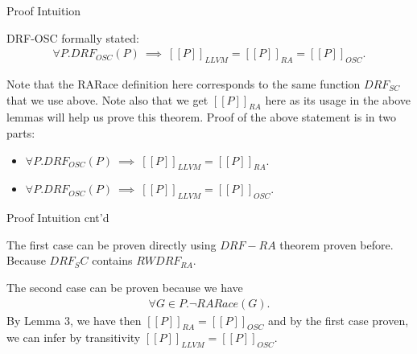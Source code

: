 \documentclass[xcolor=dvipsnames, notes]{beamer}
\begin{document}
    \begin{frame}{Proof Intuition}

        DRF-OSC formally stated:
        \begin{align*}
            \forall P.DRF_{OSC}(P) \ \implies \ [[P]]_{LLVM} = [[P]]_{RA} = [[P]]_{OSC}. 
        \end{align*}

        Note that the RARace definition here corresponds to the same function $DRF_{SC}$ that we use above.
        Note also that we get $[[P]]_{RA}$ here as its usage in the above lemmas will help us prove this theorem.
        Proof of the above statement is in two parts:
        \begin{itemize}
            \item $\forall P.DRF_{OSC}(P) \ \implies \ [[P]]_{LLVM} = [[P]]_{RA}$.
            \item $\forall P.DRF_{OSC}(P) \ \implies \ [[P]]_{LLVM} = [[P]]_{OSC}$.
        \end{itemize}

    \end{frame}


    \begin{frame}{Proof Intuition cnt'd}

        The first case can be proven directly using $DRF-RA$ theorem proven before.
        Because $DRF_SC$ contains $RWDRF_{RA}$.

        The second case can be proven because we have 
        \begin{align*}
            \forall G \in P. \neg RARace(G).
        \end{align*}
        By Lemma 3, we have then $[[P]]_{RA} = [[P]]_{OSC}$ and by the first case proven, we can infer by transitivity $[[P]]_{LLVM} = [[P]]_{OSC}$.
        
    \end{frame}

\end{document}
